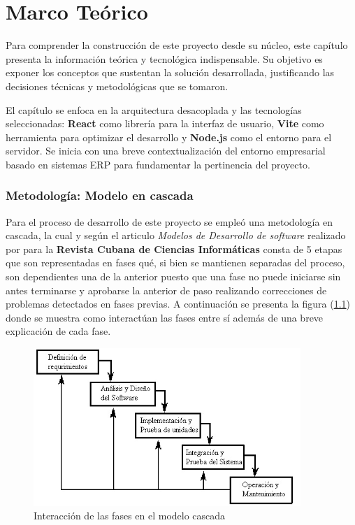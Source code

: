 \documentclass[12pt,letterpaper,spanish]{report}
\begin{document}

\chapter{Marco Teórico}
\label{chap:marco_teorico}

Para comprender la construcción de este proyecto desde su núcleo, este capítulo presenta la información teórica y tecnológica indispensable. Su objetivo es exponer los conceptos que sustentan la solución desarrollada, justificando las decisiones técnicas y metodológicas que se tomaron.

El capítulo se enfoca en la arquitectura desacoplada y las tecnologías seleccionadas: \textbf{React} como librería para la interfaz de usuario, \textbf{Vite} como herramienta para optimizar el desarrollo y \textbf{Node.js} como el entorno para el servidor. Se inicia con una breve contextualización del entorno empresarial basado en sistemas ERP para fundamentar la pertinencia del proyecto.

\subsection{Metodología: Modelo en cascada}


Para el proceso de desarrollo de este proyecto se empleó una metodología en cascada, la cual y según el articulo \textit{Modelos de Desarrollo de software} realizado por \citet{DOLIVERA2021} para la \textbf{Revista Cubana de Ciencias Informáticas} consta de 5 etapas que son representadas en fases qué, si bien se mantienen separadas del proceso, son dependientes una de la anterior puesto que una fase no puede iniciarse sin antes terminarse y aprobarse la anterior de paso realizando correcciones de problemas detectados en fases previas. A continuación se presenta la figura (\ref{CASCADA}) donde se muestra como interactúan las fases entre sí además de una breve explicación de cada fase.

\begin{figure} [H]
  \centering
  \includegraphics[width=0.9\textwidth]{CASCADA.jpg}
  \caption{Interacción de las fases en el modelo cascada}\label{CASCADA}
\end{figure}
\end{document}
